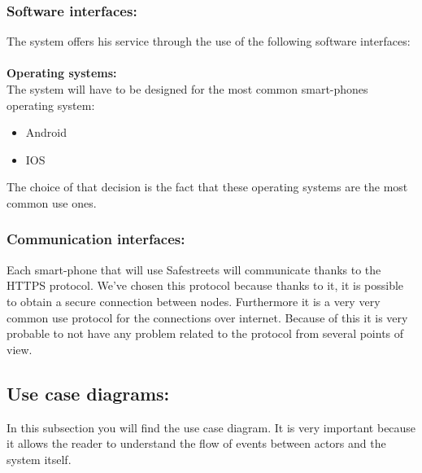 \documentclass[titlepage]{article}
\begin{document}
\begin{itemize}
\subsubsection{Software interfaces: }
The system offers his service through the use of the following software interfaces:\\ \\
\textbf{Operating systems:\\ }
The system will have to be designed for the most common smart-phones operating system: 
	
\begin{itemize}
	\item Android 
	\item IOS
\end{itemize}	
The choice of that decision is the fact that these operating systems are the most common use ones.
	
\end{itemize}
\subsubsection{Communication interfaces: }
Each smart-phone that will use Safestreets will communicate thanks to the HTTPS protocol. We've chosen this protocol because thanks to it, it is possible to obtain a secure connection between nodes. Furthermore it is a very very common use protocol for the connections over internet. Because of this it is very probable to not have any problem related to the protocol from several points of view.
\subsection{Use case diagrams: }
In this subsection you will find the use case diagram. It is very important because it allows the reader to understand the flow of events between actors and the system itself.
\end{document}
